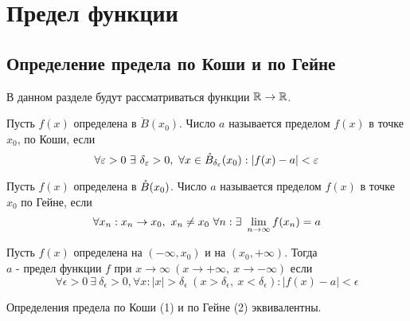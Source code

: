 \section{Предел функции}
    \subsection{Определение предела по Коши и по Гейне}
        В данном разделе будут рассматриваться функции $\mathbb{R}\to\mathbb{R}$.
        \begin{definition}
            Пусть $f(x)$ определена в $\mathring{B}(x_0)$. Число $a$ называется пределом $f(x)$ в точке $x_0$, по Коши, если  
            \[\forall \epsilon>0\ \exists\ \delta_{\epsilon}>0,\ \forall x\in \Bo_{\delta_{\epsilon}}(x_0): |f(x)-a|<\epsilon\]
        \end{definition} 
        \begin{definition}
            Пусть $f(x)$ определена в $\mathring{B}(x_0)$. Число $a$ называется пределом $f(x)$ в точке $x_0$ по Гейне, если
            \[\forall x_n: x_n\to x_0,\ x_n\ne x_0\ \forall n: \exists\ \lims f(x_n)=a\]
        \end{definition} 
        \begin{definition}
            Пусть $f(x)$ определена на $(-\infty, x_0)$ и на $(x_0, +\infty)$. Тогда \\
            $a$ - предел функции $f$ при $x\to \infty\ (x\to +\infty,\ x\to -\infty)$ если 
            \[\forall \epsilon>0\ \exists\ \delta_{\epsilon}>0, \forall x: |x|>\delta_{\epsilon}\ (x>\delta_{\epsilon},\ x<\delta_{\epsilon}): |f(x)-a|<\epsilon\]
        \end{definition} 
        \begin{theorem} 
            Определения предела по Коши (1) и по Гейне (2) эквивалентны.
        \end{theorem} 
